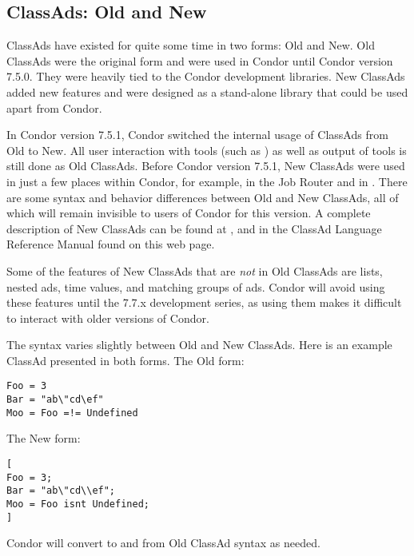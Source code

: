 \subsection{\label{sec:classad-newandold}
ClassAds: Old and New}

ClassAds have existed for quite some time in two forms:
Old and New.
Old ClassAds were the original form and were used in Condor
until Condor version 7.5.0.
They were heavily tied to the Condor development libraries.
New ClassAds added new features
and were designed as a stand-alone library that could be used apart
from Condor.

In Condor version 7.5.1, Condor switched the internal usage of
ClassAds from Old to New.
All user interaction with tools (such as ) as well as
output of tools is still done as Old ClassAds.
Before Condor version 7.5.1, New ClassAds were used in just a few places 
within Condor, 
for example, in the Job Router and  in  .
There are some syntax and behavior differences between Old and New
ClassAds,
all of which will remain invisible to users of Condor for this version.
A complete description of New ClassAds can be found at
,
and in the ClassAd Language Reference Manual found on this web page.

Some of the features of New ClassAds that are \emph{not} in Old ClassAds are
lists, nested ads, time values, and matching groups of ads.
Condor will avoid using these features until the 7.7.x development series,
as using them makes it difficult to interact with older versions of Condor.

The syntax varies slightly between Old and New ClassAds.
Here is an example ClassAd presented in both forms.
The Old form:

\begin{verbatim}
Foo = 3
Bar = "ab\"cd\ef"
Moo = Foo =!= Undefined
\end{verbatim}

The New form:

\begin{verbatim}
[
Foo = 3;
Bar = "ab\"cd\\ef";
Moo = Foo isnt Undefined;
]
\end{verbatim}

Condor will convert to and from Old ClassAd syntax as needed.


